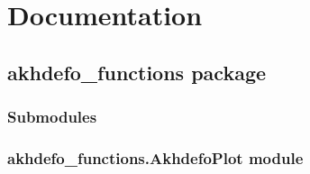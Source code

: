 \documentclass[letterpaper,10pt,english]{sphinxmanual}
\begin{document}
\section{Documentation}
\label{\detokenize{modules:documentation}}\label{\detokenize{modules::doc}}
\sphinxstepscope


\subsection{akhdefo\_functions package}
\label{\detokenize{akhdefo_functions:akhdefo-functions-package}}\label{\detokenize{akhdefo_functions::doc}}

\subsubsection{Submodules}
\label{\detokenize{akhdefo_functions:submodules}}

\subsubsection{akhdefo\_functions.AkhdefoPlot module}
\label{\detokenize{akhdefo_functions:module-akhdefo_functions.AkhdefoPlot}}\label{\detokenize{akhdefo_functions:akhdefo-functions-akhdefoplot-module}}
\end{document}
